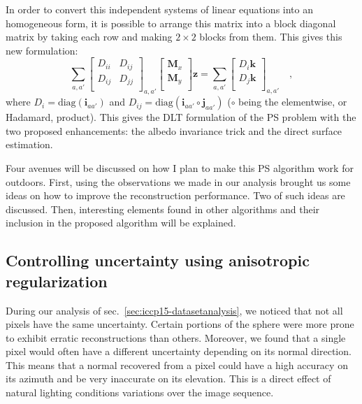 In order to convert this independent systems of linear equations into an homogeneous form, it is possible to arrange this matrix into a block diagonal matrix by taking each row and making $2 \times 2$ blocks from them.
This gives this new formulation:
\begin{equation}
\sum_{a,a'}
\begin{bmatrix}
    D_{ii} & D_{ij} \\
    D_{ij} & D_{jj} \\
\end{bmatrix}_{a,a'}
\begin{bmatrix}
    \mathbf{M}_x \\
    \mathbf{M}_y \\
\end{bmatrix}
\mathbf{z} =
\sum_{a,a'}
\begin{bmatrix}
D_i \mathbf{k} \\
D_j \mathbf{k} \\
\end{bmatrix}_{a,a'}
\quad,
\end{equation}
where $D_i = \mathrm{diag}(\mathbf{i}_{aa'})$ and $ D_{ij} = \mathrm{diag}\left(\mathbf{i}_{aa'} \circ \mathbf{j}_{aa'}\right)$ ($\circ$ being the elementwise, or Hadamard, product). This gives the DLT formulation of the PS problem with the two proposed enhancements: the albedo invariance trick and the direct surface estimation.


Four avenues will be discussed on how I plan to make this PS algorithm work for outdoors. First, using the observations we made in our analysis brought us some ideas on how to improve the reconstruction performance. Two of such ideas are discussed. Then, interesting elements found in other algorithms and their inclusion in the proposed algorithm will be explained.

\subsection{Controlling uncertainty using anisotropic regularization}
\label{subsec:reg}

During our analysis of sec.~\ref{sec:iccp15-datasetanalysis}, we noticed that not all pixels have the same uncertainty. Certain portions of the sphere were more prone to exhibit erratic reconstructions than others. Moreover, we found that a single pixel would often have a different uncertainty depending on its normal direction. This means that a normal recovered from a pixel could have a high accuracy on its azimuth and be very inaccurate on its elevation. This is a direct effect of natural lighting conditions variations over the image sequence.

